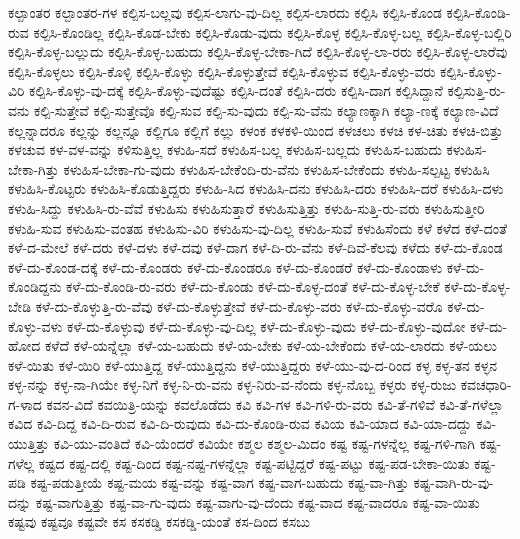 {ಕಲ್ಪಾಂತರ
ಕಲ್ಪಾಂತರ-ಗಳ
ಕಲ್ಪಿಸ-ಬಲ್ಲವು
ಕಲ್ಪಿಸ-ಲಾಗು-ವು-ದಿಲ್ಲ
ಕಲ್ಪಿಸ-ಲಾರದು
ಕಲ್ಪಿಸಿ
ಕಲ್ಪಿಸಿ-ಕೊಂಡ
ಕಲ್ಪಿಸಿ-ಕೊಂಡಿ-ರುವ
ಕಲ್ಪಿಸಿ-ಕೊಂಡಿಲ್ಲ
ಕಲ್ಪಿಸಿ-ಕೊಡ-ಬೇಕು
ಕಲ್ಪಿಸಿ-ಕೊಡು-ವುದು
ಕಲ್ಪಿಸಿ-ಕೊಳ್ಳ
ಕಲ್ಪಿಸಿ-ಕೊಳ್ಳ-ಬಲ್ಲ
ಕಲ್ಪಿಸಿ-ಕೊಳ್ಳ-ಬಲ್ಲಿರಿ
ಕಲ್ಪಿಸಿ-ಕೊಳ್ಳ-ಬಲ್ಲುದು
ಕಲ್ಪಿಸಿ-ಕೊಳ್ಳ-ಬಹುದು
ಕಲ್ಪಿಸಿ-ಕೊಳ್ಳ-ಬೇಕಾ-ಗಿದೆ
ಕಲ್ಪಿಸಿ-ಕೊಳ್ಳ-ಲಾ-ರರು
ಕಲ್ಪಿಸಿ-ಕೊಳ್ಳ-ಲಾರೆವು
ಕಲ್ಪಿಸಿ-ಕೊಳ್ಳಲು
ಕಲ್ಪಿಸಿ-ಕೊಳ್ಳಿ
ಕಲ್ಪಿಸಿ-ಕೊಳ್ಳು
ಕಲ್ಪಿಸಿ-ಕೊಳ್ಳುತ್ತೇವೆ
ಕಲ್ಪಿಸಿ-ಕೊಳ್ಳುವ
ಕಲ್ಪಿಸಿ-ಕೊಳ್ಳು-ವರು
ಕಲ್ಪಿಸಿ-ಕೊಳ್ಳು-ವಿರಿ
ಕಲ್ಪಿಸಿ-ಕೊಳ್ಳು-ವು-ದಕ್ಕೆ
ಕಲ್ಪಿಸಿ-ಕೊಳ್ಳು-ವುದೆಷ್ಟು
ಕಲ್ಪಿಸಿ-ದಂತೆ
ಕಲ್ಪಿಸಿ-ದರು
ಕಲ್ಪಿಸಿ-ದಾಗ
ಕಲ್ಪಿಸಿದ್ದಾನೆ
ಕಲ್ಪಿಸುತ್ತಿ-ರು-ವನು
ಕಲ್ಪಿ-ಸುತ್ತೇವೆ
ಕಲ್ಪಿ-ಸುತ್ತೇವೊ
ಕಲ್ಪಿ-ಸುವ
ಕಲ್ಪಿ-ಸು-ವುದು
ಕಲ್ಪಿ-ಸು-ವೆನು
ಕಲ್ಯಾಣಕ್ಕಾಗಿ
ಕಲ್ಯಾ-ಣಕ್ಕೆ
ಕಲ್ಯಾಣ-ವಿದೆ
ಕಲ್ಲನ್ನಾದರೂ
ಕಲ್ಲನ್ನು
ಕಲ್ಲನ್ನೂ
ಕಲ್ಲಿಗೂ
ಕಲ್ಲಿಗೆ
ಕಲ್ಲು
ಕಳಂಕ
ಕಳಕಳಿ-ಯಿಂದ
ಕಳಚಲು
ಕಳಚಿ
ಕಳ-ಚಿತು
ಕಳಚಿ-ಬಿತ್ತು
ಕಳಚುವ
ಕಳ-ವಳ-ವನ್ನು
ಕಳಿಸುತ್ತಿಲ್ಲ
ಕಳುಹಿ-ಸದೆ
ಕಳುಹಿಸ-ಬಲ್ಲ
ಕಳುಹಿಸ-ಬಲ್ಲದು
ಕಳುಹಿಸ-ಬಹುದು
ಕಳುಹಿಸ-ಬೇಕಾ-ಗಿತ್ತು
ಕಳುಹಿಸ-ಬೇಕಾ-ಗು-ವುದು
ಕಳುಹಿಸ-ಬೇಕೆಂದಿ-ರು-ವೆನು
ಕಳುಹಿಸ-ಬೇಕೆಂದು
ಕಳುಹಿ-ಸಲ್ಪಟ್ಟ
ಕಳುಹಿಸಿ
ಕಳುಹಿಸಿ-ಕೊಟ್ಟರು
ಕಳುಹಿಸಿ-ಕೊಡುತ್ತಿದ್ದರು
ಕಳುಹಿ-ಸಿದ
ಕಳುಹಿಸಿ-ದನು
ಕಳುಹಿಸಿ-ದರು
ಕಳುಹಿಸಿ-ದರೆ
ಕಳುಹಿಸಿ-ದಳು
ಕಳುಹಿ-ಸಿದ್ದು
ಕಳುಹಿಸಿ-ರು-ವೆವೆ
ಕಳುಹಿಸು
ಕಳುಹಿಸುತ್ತಾರೆ
ಕಳುಹಿಸುತ್ತಿತ್ತು
ಕಳುಹಿ-ಸುತ್ತಿ-ರು-ವರು
ಕಳುಹಿಸುತ್ತೀರಿ
ಕಳುಹಿ-ಸುವ
ಕಳುಹಿಸು-ವಂತಹ
ಕಳುಹಿಸು-ವಿರಿ
ಕಳುಹಿಸು-ವು-ದಿಲ್ಲ
ಕಳುಹಿ-ಸುವೆ
ಕಳುಹಿಸೆಂದು
ಕಳೆ
ಕಳೆದ
ಕಳೆ-ದಂತೆ
ಕಳೆ-ದ-ಮೇಲೆ
ಕಳೆ-ದರು
ಕಳೆ-ದಳು
ಕಳೆ-ದವು
ಕಳೆ-ದಾಗ
ಕಳೆ-ದಿ-ರು-ವೆನು
ಕಳೆ-ದಿವೆ-ಕೆಲವು
ಕಳೆದು
ಕಳೆ-ದು-ಕೊಂಡ
ಕಳೆ-ದು-ಕೊಂಡ-ದಕ್ಕೆ
ಕಳೆ-ದು-ಕೊಂಡರು
ಕಳೆ-ದು-ಕೊಂಡರೂ
ಕಳೆ-ದು-ಕೊಂಡರೆ
ಕಳೆ-ದು-ಕೊಂಡಾಳು
ಕಳೆ-ದು-ಕೊಂಡಿದ್ದನು
ಕಳೆ-ದು-ಕೊಂಡಿ-ರು-ವರು
ಕಳೆ-ದು-ಕೊಂಡು
ಕಳೆ-ದು-ಕೊಳ್ಳ-ದಂತೆ
ಕಳೆ-ದು-ಕೊಳ್ಳ-ಬೇಕೆ
ಕಳೆ-ದು-ಕೊಳ್ಳ-ಬೇಡಿ
ಕಳೆ-ದು-ಕೊಳ್ಳುತ್ತಿ-ರು-ವೆವು
ಕಳೆ-ದು-ಕೊಳ್ಳುತ್ತೇವೆ
ಕಳೆ-ದು-ಕೊಳ್ಳು-ವರು
ಕಳೆ-ದು-ಕೊಳ್ಳು-ವರೊ
ಕಳೆ-ದು-ಕೊಳ್ಳು-ವಳು
ಕಳೆ-ದು-ಕೊಳ್ಳುವು
ಕಳೆ-ದು-ಕೊಳ್ಳು-ವು-ದಿಲ್ಲ
ಕಳೆ-ದು-ಕೊಳ್ಳು-ವುದು
ಕಳೆ-ದು-ಕೊಳ್ಳು-ವುದೋ
ಕಳೆ-ದು-ಹೋದ
ಕಳೆದೆ
ಕಳೆ-ಯನ್ನೆಲ್ಲಾ
ಕಳೆ-ಯ-ಬಹುದು
ಕಳೆ-ಯ-ಬೇಕು
ಕಳೆ-ಯ-ಬೇಕೆಂದು
ಕಳೆ-ಯ-ಲಾರದು
ಕಳೆ-ಯಲು
ಕಳೆ-ಯಿತು
ಕಳೆ-ಯಿರಿ
ಕಳೆ-ಯುತ್ತಿದ್ದ
ಕಳೆ-ಯುತ್ತಿದ್ದನು
ಕಳೆ-ಯುತ್ತಿದ್ದರು
ಕಳೆ-ಯು-ವು-ದ-ರಿಂದ
ಕಳ್ಳ
ಕಳ್ಳ-ತನ
ಕಳ್ಳನ
ಕಳ್ಳ-ನನ್ನು
ಕಳ್ಳ-ನಾ-ಗಿಯೇ
ಕಳ್ಳ-ನಿಗೆ
ಕಳ್ಳ-ನಿ-ರು-ವನು
ಕಳ್ಳ-ನಿರು-ವ-ನೆಂದು
ಕಳ್ಳ-ನೊಬ್ಬ
ಕಳ್ಳರು
ಕಳ್ಳ-ರುಜು
ಕವಚಧಾರಿ-ಗ-ಳಾದ
ಕವನ-ವಿದೆ
ಕವಯಿತ್ರಿ-ಯನ್ನು
ಕವಲೊಡೆದು
ಕವಿ
ಕವಿ-ಗಳ
ಕವಿ-ಗಳಿ-ರು-ವರು
ಕವಿ-ತೆ-ಗಳಿವೆ
ಕವಿ-ತೆ-ಗಳೆಲ್ಲಾ
ಕವಿದ
ಕವಿ-ದಿದ್ದ
ಕವಿ-ದಿ-ರುವ
ಕವಿ-ದಿ-ರುವುದು
ಕವಿ-ದು-ಕೊಂಡಿ-ರುವ
ಕವಿಯ
ಕವಿ-ಯಾದ
ಕವಿ-ಯಾ-ದದ್ದು
ಕವಿ-ಯುತ್ತಿತ್ತು
ಕವಿ-ಯು-ವಂತಿದೆ
ಕವಿ-ಯೆಂದರೆ
ಕವಿಯೇ
ಕಶ್ಮಲ
ಕಶ್ಮಲ-ಮಿದಂ
ಕಷ್ಟ
ಕಷ್ಟ-ಗಳನ್ನೆಲ್ಲ
ಕಷ್ಟ-ಗಳಿ-ಗಾಗಿ
ಕಷ್ಟ-ಗಳೆಲ್ಲ
ಕಷ್ಟದ
ಕಷ್ಟ-ದಲ್ಲಿ
ಕಷ್ಟ-ದಿಂದ
ಕಷ್ಟ-ನಷ್ಟ-ಗಳನ್ನೆಲ್ಲಾ
ಕಷ್ಟ-ಪಟ್ಟಿದ್ದರೆ
ಕಷ್ಟ-ಪಟ್ಟು
ಕಷ್ಟ-ಪಡ-ಬೇಕಾ-ಯಿತು
ಕಷ್ಟ-ಪಡಿ
ಕಷ್ಟ-ಪಡುತ್ತೀಯೆ
ಕಷ್ಟ-ಮಯ
ಕಷ್ಟ-ವನ್ನು
ಕಷ್ಟ-ವಾಗ
ಕಷ್ಟ-ವಾಗ-ಬಹುದು
ಕಷ್ಟ-ವಾ-ಗಿತ್ತು
ಕಷ್ಟ-ವಾಗಿ-ರು-ವು-ದನ್ನು
ಕಷ್ಟ-ವಾಗುತ್ತಿತ್ತು
ಕಷ್ಟ-ವಾ-ಗು-ವುದು
ಕಷ್ಟ-ವಾಗು-ವು-ದೆಂದು
ಕಷ್ಟ-ವಾದ
ಕಷ್ಟ-ವಾದರೂ
ಕಷ್ಟ-ವಾ-ಯಿತು
ಕಷ್ಟವು
ಕಷ್ಟವೂ
ಕಷ್ಟವೇ
ಕಸ
ಕಸಕಡ್ಡಿ
ಕಸಕಡ್ಡಿ-ಯಂತೆ
ಕಸ-ದಿಂದ
ಕಸಬು
}
